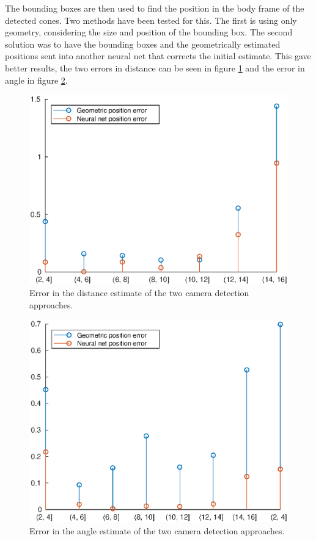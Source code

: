 The bounding boxes are then used to find the position in the body frame of the detected cones. Two methods have been tested for this. The first is using only geometry, considering the size and position of the bounding box. The second solution was to have the bounding boxes and the geometrically estimated positions sent into another neural net that corrects the initial estimate. This gave better results, the two errors in distance can be seen in figure \ref{Fig:rErrorCamera} and the error in angle in figure \ref{Fig:psiErrorCamera}.

\begin{figure}
    \centering
    \includegraphics[width=0.8\linewidth]{0_Images/3_Theory/camDetection/rErrorCamera.eps}
    \caption[Error in the distance estimate of the two camera detection approaches.]
    {Error in the distance estimate of the two camera detection approaches.}
    \label{Fig:rErrorCamera}
\end{figure}

\begin{figure}
    \centering
    \includegraphics[width=0.8\linewidth]{0_Images/3_Theory/camDetection/psiErrorCamera.eps}
    \caption[Error in the angle estimate of the two camera detection approaches.]
    {Error in the angle estimate of the two camera detection approaches.}
    \label{Fig:psiErrorCamera}
\end{figure}

